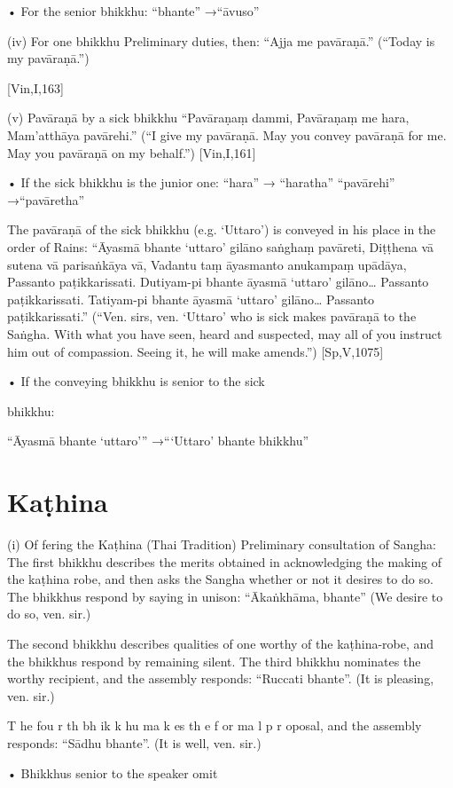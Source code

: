 • For the senior bhikkhu: “bhante” →“āvuso”

(iv) For one bhikkhu
Preliminary duties, then:
“Ajja me pavāraṇā.”
(“Today is my pavāraṇā.”)

[Vin,I,163]

(v) Pavāraṇā by a sick bhikkhu
“Pavāraṇaṃ dammi,
Pavāraṇaṃ me hara,
Mam’atthāya pavārehi.”
(“I give my pavāraṇā. May you convey pavāraṇā for
me. May you pavāraṇā on my behalf.”)
[Vin,I,161]

• If the sick bhikkhu is the junior one:
“hara” → “haratha”
“pavārehi” →“pavāretha”

The pavāraṇā of the sick bhikkhu (e.g. ‘Uttaro’)
is conveyed in his place in the order of Rains:
“Āyasmā bhante ‘uttaro’ gilāno saṅghaṃ pavāreti,
Diṭṭhena vā sutena vā parisaṅkāya vā,
Vadantu taṃ āyasmanto anukampaṃ upādāya,
Passanto paṭikkarissati.
Dutiyam-pi bhante āyasmā ‘uttaro’ gilāno…
Passanto paṭikkarissati.
Tatiyam-pi bhante āyasmā ‘uttaro’ gilāno…
Passanto paṭikkarissati.”
(“Ven. sirs, ven. ‘Uttaro’ who is sick makes pavāraṇā
to the Saṅgha. With what you have seen, heard and
suspected, may all of you instruct him out of
compassion. Seeing it, he will make amends.”)
[Sp,V,1075]

• If the conveying bhikkhu is senior to the sick

bhikkhu:

“Āyasmā bhante ‘uttaro’”
→“‘Uttaro’ bhante bhikkhu”

\section{Kaṭhina}

(i) Of fering the Kaṭhina (Thai Tradition)
Preliminary consultation of Sangha:
The first bhikkhu describes the merits obtained
in acknowledging the making of the kaṭhina
robe, and then asks the Sangha whether or not
it desires to do so. The bhikkhus respond by
saying in unison:
“Ākaṅkhāma, bhante”
(We desire to do so, ven. sir.)

The second bhikkhu describes qualities of one
worthy of the kaṭhina-robe, and the bhikkhus
respond by remaining silent.
The third bhikkhu nominates the worthy
recipient, and the assembly responds:
“Ruccati bhante”.
(It is pleasing, ven. sir.)

T he fou r th bh ik k hu ma k es th e f or ma l p r oposal, and the assembly responds:
“Sādhu bhante”.
(It is well, ven. sir.)

• Bhikkhus senior to the speaker omit

